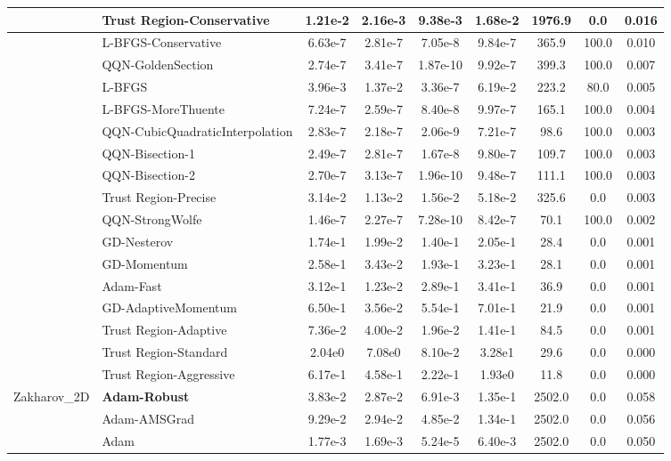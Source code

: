 \documentclass{article}
\begin{document}
\begin{longtable}{|l|l|c|c|c|c|c|c|c|}
\hline
 & Trust Region-Conservative & 1.21e-2 & 2.16e-3 & 9.38e-3 & 1.68e-2 & 1976.9 & 0.0 & 0.016 \\
\hline
 & L-BFGS-Conservative & 6.63e-7 & 2.81e-7 & 7.05e-8 & 9.84e-7 & 365.9 & 100.0 & 0.010 \\
\hline
 & QQN-GoldenSection & 2.74e-7 & 3.41e-7 & 1.87e-10 & 9.92e-7 & 399.3 & 100.0 & 0.007 \\
\hline
 & L-BFGS & 3.96e-3 & 1.37e-2 & 3.36e-7 & 6.19e-2 & 223.2 & 80.0 & 0.005 \\
\hline
 & L-BFGS-MoreThuente & 7.24e-7 & 2.59e-7 & 8.40e-8 & 9.97e-7 & 165.1 & 100.0 & 0.004 \\
\hline
 & QQN-CubicQuadraticInterpolation & 2.83e-7 & 2.18e-7 & 2.06e-9 & 7.21e-7 & 98.6 & 100.0 & 0.003 \\
\hline
 & QQN-Bisection-1 & 2.49e-7 & 2.81e-7 & 1.67e-8 & 9.80e-7 & 109.7 & 100.0 & 0.003 \\
\hline
 & QQN-Bisection-2 & 2.70e-7 & 3.13e-7 & 1.96e-10 & 9.48e-7 & 111.1 & 100.0 & 0.003 \\
\hline
 & Trust Region-Precise & 3.14e-2 & 1.13e-2 & 1.56e-2 & 5.18e-2 & 325.6 & 0.0 & 0.003 \\
\hline
 & QQN-StrongWolfe & 1.46e-7 & 2.27e-7 & 7.28e-10 & 8.42e-7 & 70.1 & 100.0 & 0.002 \\
\hline
 & GD-Nesterov & 1.74e-1 & 1.99e-2 & 1.40e-1 & 2.05e-1 & 28.4 & 0.0 & 0.001 \\
\hline
 & GD-Momentum & 2.58e-1 & 3.43e-2 & 1.93e-1 & 3.23e-1 & 28.1 & 0.0 & 0.001 \\
\hline
 & Adam-Fast & 3.12e-1 & 1.23e-2 & 2.89e-1 & 3.41e-1 & 36.9 & 0.0 & 0.001 \\
\hline
 & GD-AdaptiveMomentum & 6.50e-1 & 3.56e-2 & 5.54e-1 & 7.01e-1 & 21.9 & 0.0 & 0.001 \\
\hline
 & Trust Region-Adaptive & 7.36e-2 & 4.00e-2 & 1.96e-2 & 1.41e-1 & 84.5 & 0.0 & 0.001 \\
\hline
 & Trust Region-Standard & 2.04e0 & 7.08e0 & 8.10e-2 & 3.28e1 & 29.6 & 0.0 & 0.000 \\
\hline
 & Trust Region-Aggressive & 6.17e-1 & 4.58e-1 & 2.22e-1 & 1.93e0 & 11.8 & 0.0 & 0.000 \\
Zakharov\_2D & \textbf{Adam-Robust} & 3.83e-2 & 2.87e-2 & 6.91e-3 & 1.35e-1 & 2502.0 & 0.0 & 0.058 \\
\hline
 & Adam-AMSGrad & 9.29e-2 & 2.94e-2 & 4.85e-2 & 1.34e-1 & 2502.0 & 0.0 & 0.056 \\
\hline
 & Adam & 1.77e-3 & 1.69e-3 & 5.24e-5 & 6.40e-3 & 2502.0 & 0.0 & 0.050 \\

\end{longtable}
\end{document}
